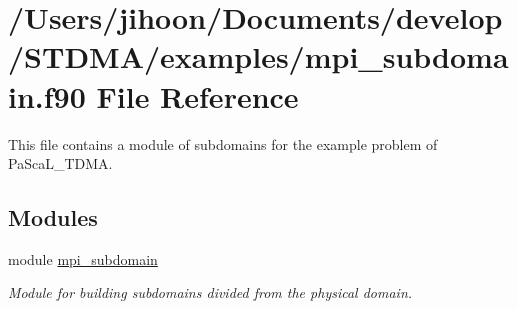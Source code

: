 \hypertarget{mpi__subdomain_8f90}{}\section{/\+Users/jihoon/\+Documents/develop/\+S\+T\+D\+M\+A/examples/mpi\+\_\+subdomain.f90 File Reference}
\label{mpi__subdomain_8f90}


This file contains a module of subdomains for the example problem of Pa\+Sca\+L\+\_\+\+T\+D\+MA.  


\subsection*{Modules}
\begin{DoxyCompactItemize}
\item 
module \mbox{\hyperlink{namespacempi__subdomain}{mpi\+\_\+subdomain}}
\begin{DoxyCompactList}\small\item\em Module for building subdomains divided from the physical domain. \end{DoxyCompactList}\end{DoxyCompactItemize}
